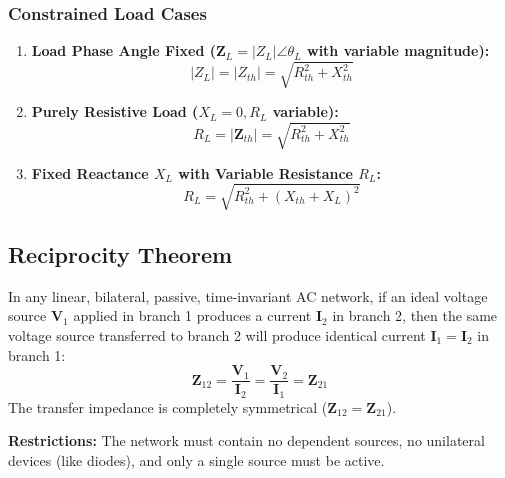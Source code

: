 \documentclass[12pt,a4paper]{article}
\begin{document}
\subsubsection{Constrained Load Cases}
\begin{enumerate}[leftmargin=*, itemsep=2pt]
  \item \textbf{Load Phase Angle Fixed ($\mathbf{Z}_L = |Z_L|\angle \theta_L$ with variable magnitude):}
  \begin{equation}
    |Z_L| = |Z_{th}| = \sqrt{R_{th}^2 + X_{th}^2}
  \end{equation}
  \item \textbf{Purely Resistive Load ($X_L = 0, R_L$ variable):}
  \begin{equation}
    R_L = |\mathbf{Z}_{th}| = \sqrt{R_{th}^2 + X_{th}^2}
  \end{equation}
  \item \textbf{Fixed Reactance $X_L$ with Variable Resistance $R_L$:}
  \begin{equation}
    R_L = \sqrt{R_{th}^2 + (X_{th} + X_L)^2}
  \end{equation}
\end{enumerate}

\subsection{Reciprocity Theorem}

\begin{tcolorbox}[defbox, title={\textbf{Reciprocity Theorem in AC Networks}}]
In any linear, bilateral, passive, time-invariant AC network, if an ideal voltage source $\mathbf{V}_1$ applied in branch 1 produces a current $\mathbf{I}_2$ in branch 2, then the same voltage source transferred to branch 2 will produce identical current $\mathbf{I}_1 = \mathbf{I}_2$ in branch 1:
\begin{equation}
  \mathbf{Z}_{12} = \frac{\mathbf{V}_1}{\mathbf{I}_2} = \frac{\mathbf{V}_2}{\mathbf{I}_1} = \mathbf{Z}_{21}
\end{equation}
The transfer impedance is completely symmetrical ($\mathbf{Z}_{12} = \mathbf{Z}_{21}$).
\end{tcolorbox}
\par\vspace{4pt}\noindent
\textbf{Restrictions:} The network must contain no dependent sources, no unilateral devices (like diodes), and only a single source must be active.
\end{document}
